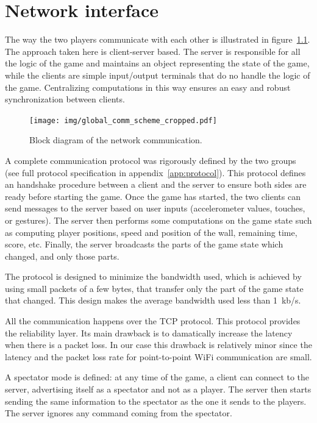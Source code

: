 \documentclass[english, DIV=13]{scrreprt}
\begin{document}
\chapter{Network interface}
\label{chap:net-interface}

The way the two players communicate with each other is illustrated in
figure~\ref{fig:comm-scheme}.
The approach taken here is client-server based. The server is responsible
for all the logic of the game and maintains an object representing the state of the game,
while the clients are simple input/output terminals that do no handle the logic of the
game. Centralizing computations in this way ensures an easy and robust synchronization
between clients.

\begin{figure}[hbt]
    \centering
    \texttt{[image: img/global\_comm\_scheme\_cropped.pdf]}
    \caption{Block diagram of the network communication.}
    \label{fig:comm-scheme}
\end{figure}

A complete communication protocol was rigorously defined by the two groups (see full
protocol specification in appendix~\ref{app:protocol}).
This protocol defines an handshake procedure between a client and the server to ensure both
sides are ready before starting the game.
Once the game has started, the two clients can send
messages to the server based on user inputs (accelerometer values, touches, or gestures).
The server then performs some computations on the game state such as computing player
positions, speed and position of the wall, remaining time, score, etc. Finally, the server
broadcasts the parts of the game state which changed, and only those parts.

The protocol is designed to minimize the bandwidth used, which is achieved by using small packets
of a few bytes, that transfer only the part of the game state that changed.
This design makes the average bandwidth used less than \SI{1}{kb/s}.

All the communication happens over the TCP protocol. This protocol provides the reliability
layer. Its main drawback is to damatically increase the latency when there is a packet loss.
In our case this drawback is relatively minor since the latency and the packet loss rate
for point-to-point WiFi communication are small.

A spectator mode is defined: at any time of the game, a client can connect to the server,
advertising itself as a spectator and not as a player. The server then starts sending the
same information to the spectator as the one it sends to the players. The server ignores
any command coming from the spectator.
\end{document}
